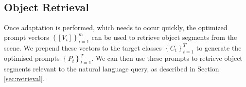 \subsection{Object Retrieval}
Once adaptation is performed, which needs to occur quickly, the optimized prompt vectors $\left\{\left[V_{i} \right]\right\}_{i=1}^{m}$ can be used to retrieve object segments from the scene. We prepend these vectors to the target classes $\left\{C_{t} \right\}_{t=1}^{T}$ to generate the optimised prompts $\left\{P_{t} \right\}_{t=1}^{T}$. We can then use these prompts to retrieve object segments relevant to the natural language query, as described in Section \ref{sec:retrieval}.

